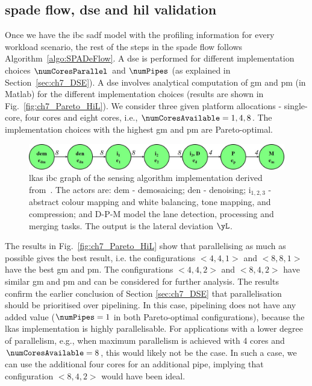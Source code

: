 \subsection{\texorpdfstring{\Gls{spade}}{SPADe} flow, \texorpdfstring{\gls{dse}}{DSE} and \texorpdfstring{\gls{hil}}{HiL} validation}
Once we have the \gls{ibc} \gls{sadf} model with the profiling information for every workload scenario, the rest of the steps in the \gls{spade} flow follows Algorithm~\ref{algo:SPADeFlow}.
A \gls{dse} is performed for different implementation choices  $\numCoresParallel$ and $\numPipes$ (as explained in Section~\ref{sec:ch7_DSE}).
A \gls{dse} involves analytical computation of \gls{gm} and \gls{pm} (in Matlab) for the different implementation choices (results are shown in Fig.~\ref{fig:ch7_Pareto_HiL}). 
We consider three given platform allocations - single-core, four cores and eight cores, i.e., $\numCoresAvailable=1,4,8$. The implementation choices with the highest \gls{gm} and \gls{pm} are Pareto-optimal.

\begin{figure}[t]
\centerline{
    \includegraphics[width=\textwidth]{images/HiL_GS.jpg}
    }
    \caption{\Gls{lkas} \gls{ibc} graph of the sensing algorithm implementation derived from~\cite{de2020approximation}. The actors are: dem - demosaicing; den - denoising; i$_{1,2,3}$ - abstract colour mapping and white balancing, tone mapping, and compression; and D-P-M model the lane detection, processing and merging tasks. The output is the lateral deviation $\yL$.}
    \label{fig:ch7_hilSADF}
\end{figure}

The results in Fig.~\ref{fig:ch7_Pareto_HiL} show that parallelising as much as possible gives the best result, i.e. the configurations $<4,4,1>$ and $<8,8,1>$ have the best \gls{gm} and \gls{pm}. The configurations $<4,4,2>$ and $<8,4,2>$ have similar \gls{gm} and \gls{pm} and can be considered for further analysis. 
The results confirm the earlier conclusion of Section \ref{sec:ch7_DSE} that parallelisation should be prioritised over pipelining. In this case, pipelining does not have any added value ($\numPipes=1$ in both Pareto-optimal configurations), because the \gls{lkas} implementation is highly parallelisable.
For applications with a lower degree of parallelism, e.g., when maximum parallelism is achieved with 4 cores and $\numCoresAvailable=8$, this would likely not be the case. In such a case, we can use the additional four cores for an additional pipe, implying that configuration $<8,4,2>$ would have been ideal.

